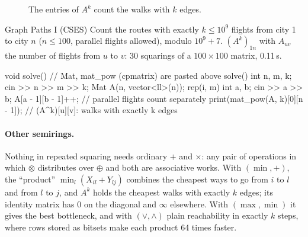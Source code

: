 \begin{figure}[htbp]
\centering
{}
\caption{The entries of $A^k$ count the walks with $k$ edges.}
\label{fig:walks}
\end{figure}


\begin{problem}{Graph Paths I (CSES)}
Count the routes with exactly $k \le 10^9$ flights from city 1 to city $n$ ($n \le 100$, parallel flights allowed), modulo $10^9 + 7$.
\solution $(A^k)_{1n}$ with $A_{uv}$ the number of flights from $u$ to $v$: 30 squarings of a $100 \times 100$ matrix, 0.11\,s.
\end{problem}

\begin{code}
void solve() {  // Mat, mat_pow (cpmatrix) are pasted above solve()
    int n, m, k;
    cin >> n >> m >> k;
    Mat A(n, vector<ll>(n));
    rep(i, m) {
        int a, b;
        cin >> a >> b;
        A[a - 1][b - 1]++;  // parallel flights count separately
    }
    print(mat_pow(A, k)[0][n - 1]);  // (A^k)[u][v]: walks with exactly k edges
}
\end{code}

\paragraph{Other semirings.} Nothing in repeated squaring needs ordinary $+$ and $\times$: any pair of operations in which $\otimes$
distributes over $\oplus$ and both are associative works. With $(\min, +)$, the ``product'' $\min_l (X_{il} + Y_{lj})$ combines the
cheapest ways to go from $i$ to $l$ and from $l$ to $j$, and $A^k$ holds the cheapest walks with exactly $k$ edges; its identity matrix
has 0 on the diagonal and $\infty$ elsewhere. With $(\max, \min)$ it gives the best bottleneck, and with $(\lor, \land)$ plain
reachability in exactly $k$ steps, where rows stored as bitsets make each product 64 times faster.

